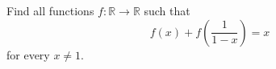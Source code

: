 Find all functions $f : \mathbb{R} \to \mathbb{R}$ such that
\[
f(x) + f\left(\frac{1}{1-x}\right) = x
\]
for every $x \neq 1$.
